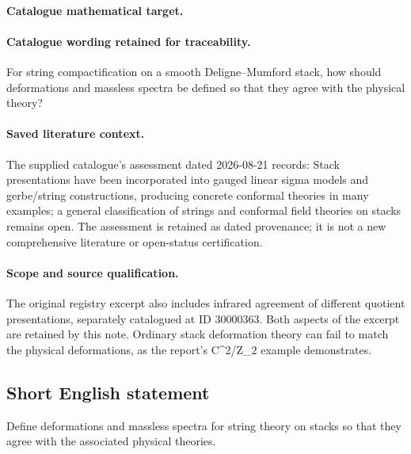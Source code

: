\documentclass[11pt]{article}
\begin{document}
\paragraph{Catalogue mathematical target.}
\paragraph{Catalogue wording retained for traceability.}
For string compactification on a smooth Deligne–Mumford stack, how should deformations and massless spectra be defined so that they agree with the physical theory?

\paragraph{Saved literature context.} The supplied catalogue's assessment dated 2026-08-21 records: Stack presentations have been incorporated into gauged linear sigma models and gerbe/string constructions, producing concrete conformal theories in many examples; a general classification of strings and conformal field theories on stacks remains open. The assessment is retained as dated provenance; it is not a new comprehensive literature or open-status certification.
\paragraph{Scope and source qualification.}The original registry excerpt also includes infrared agreement of different quotient presentations, separately catalogued at ID 30000363. Both aspects of the excerpt are retained by this note. Ordinary stack deformation theory can fail to match the physical deformations, as the report's C^2/Z_2 example demonstrates.
\subsection{Short English statement}
Define deformations and massless spectra for string theory on stacks so that they agree with the associated physical theories.
\end{document}
